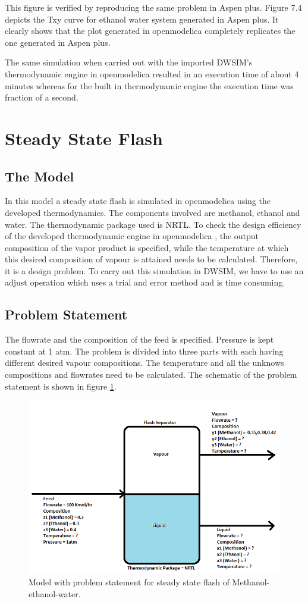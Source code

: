 \documentclass[12pt]{report}
\begin{document}
\begin{itemize}
This figure is verified by reproducing the same problem in Aspen plus. Figure 7.4 depicts the Txy curve for ethanol water system generated in Aspen plus. It clearly shows that the plot generated in openmodelica completely replicates the one generated in Aspen plus.

The same simulation when carried out with the imported DWSIM's thermodynamic engine in openmodelica resulted in an execution time of about 4 minutes whereas for the built in thermodynamic engine the execution time was fraction of a second.  

\end{itemize}
\section{Steady State Flash}
\subsection{The Model}
In this model a steady state flash is simulated in openmodelica using the developed thermodynamics. The components involved are methanol, ethanol and water. The thermodynamic package used is NRTL. To check the design efficiency of the developed thermodynamic engine in openmodelica , the output composition of the vapor product is specified, while the temperature at which this desired composition of vapour is attained needs to be calculated. Therefore, it is a design problem. To carry out this simulation in DWSIM, we have to use an adjust operation which uses a trial and error method and is time consuming.

\subsection{Problem Statement}
The flowrate and the composition of the feed is specified. Pressure is kept constant at 1 atm. The problem is divided into three parts with each having different desired vapour compositions. The temperature and all the unknows compositions and flowrates need to be calculated. The schematic of the problem statement is shown in figure \ref{Flash}.

\begin{figure}
\centering
\includegraphics[width=0.8\linewidth]{Flash}
\caption{Model with problem statement for steady state flash of Methanol-ethanol-water.}
\label{Flash}
\end{figure}
\end{document}
